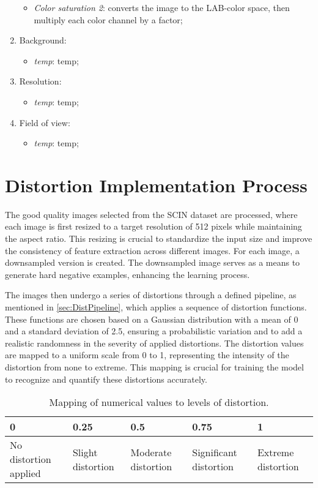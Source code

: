 \begin{enumerate}
\begin{itemize}
            \item \textit{Color saturation 2}: converts the image to the LAB-color space, then multiply each color channel by a factor;
        \end{itemize}
    \item Background:
        \begin{itemize}
            \item \textit{temp}: temp;
        \end{itemize}
    \item Resolution:
        \begin{itemize}
            \item \textit{temp}: temp;
        \end{itemize}
    \item Field of view:
        \begin{itemize}
            \item \textit{temp}: temp;
        \end{itemize}
\end{enumerate}

\section{Distortion Implementation Process}
\label{sec:DistProcess}
The good quality images selected from the SCIN \autocite{SCIN} dataset are processed, where each image is first resized to a target resolution of 512 pixels while maintaining the aspect ratio. This resizing is crucial to standardize the input size and improve the consistency of feature extraction across different images. For each image, a downsampled version is created. The downsampled image serves as a means to generate hard negative examples, enhancing the learning process. \par
\vspace{\baselineskip}
\noindent
The images then undergo a series of distortions through a defined pipeline, as mentioned in \autoref{sec:DistPipeline}, which applies a sequence of distortion functions. These functions are chosen based on a Gaussian distribution with a mean of 0 and a standard deviation of 2.5, ensuring a probabilistic variation and to add a realistic randomness in the severity of applied distortions. The distortion values are mapped to a uniform scale from 0 to 1, representing the intensity of the distortion from none to extreme. This mapping is crucial for training the model to recognize and quantify these distortions accurately. \par
\begin{table}[h]
    \centering
    \begin{tabularx}{\textwidth}{|X|X|X|X|X|}
        \hline
        \textbf{0} & \textbf{0.25} & \textbf{0.5} & \textbf{0.75} & \textbf{1} \\ \hline
        No distortion applied & Slight distortion & Moderate distortion & Significant distortion & Extreme distortion \\ \hline
    \end{tabularx}
    \caption{Mapping of numerical values to levels of distortion.}
    \label{tab:a}
\end{table}

